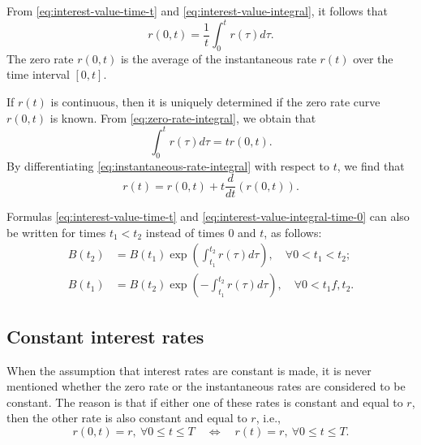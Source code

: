 From \eqref{eq:interest-value-time-t} and \eqref{eq:interest-value-integral}, it
    follows that
\begin{equation}
    r(0, t) = \frac{1}{t} \int_{0}^{t} r(\tau) d\tau.
    \label{eq:zero-rate-integral}
\end{equation}
The zero rate $ r(0, t) $ is the average of the instantaneous rate $ r(t) $ over
    the time interval $ [0, t] $.

If $ r(t) $ is continuous, then it is uniquely determined if the zero rate curve
    $ r(0, t) $ is known.
From \eqref{eq:zero-rate-integral}, we obtain that
\begin{equation}
    \int_{0}^{t} r(\tau) d\tau = t r(0, t).
    \label{eq:instantaneous-rate-integral}
\end{equation}
By differentiating \eqref{eq:instantaneous-rate-integral} with respect to $ t $,
    we find that
\begin{equation}
    r(t) = r(0, t) + t \frac{d}{dt} (r(0, t)).
    \label{eq:instantaneous-rate-governing}
\end{equation}

Formulas \eqref{eq:interest-value-time-t} and
    \eqref{eq:interest-value-integral-time-0} can also be written for times
    $ t_1 < t_2 $ instead of times 0 and $ t $, as follows:
\begin{align}
    B(t_2) &= B(t_1) \exp \left( \int_{t_1}^{t_2} r(\tau) d\tau \right),
        \quad \forall 0 < t_1 < t_2;
        \label{eq:interest-value-integral-t2} \\
    B(t_1) &= B(t_2) \exp \left( -\int_{t_1}^{t_2} r(\tau) d\tau \right),
        \quad \forall 0 < t_1 f, t_2.
        \label{eq:interest-value-integral-t1}
\end{align}

\subsection{Constant interest rates}
When the assumption that interest rates are constant is made, it is never
    mentioned whether the zero rate or the instantaneous rates are considered
    to be constant.
The reason is that if either one of these rates is constant and equal to $ r $,
    then the other rate is also constant and equal to $ r $, i.e.,
\begin{equation*}
    r(0, t) = r,\ \forall 0 \leq t \leq T \quad \Leftrightarrow \quad
        r(t) = r,\ \forall 0 \leq t \leq T.
\end{equation*}

